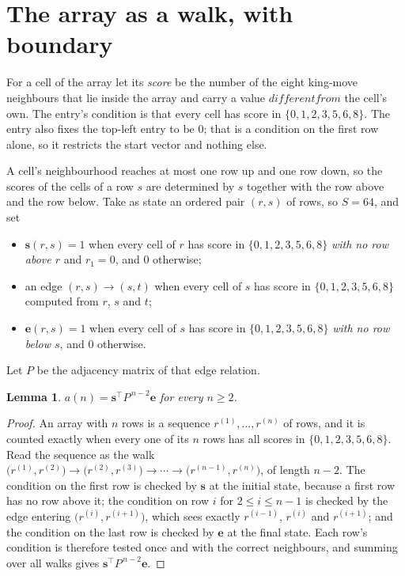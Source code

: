\documentclass[11pt,a4paper]{article}
\theoremstyle{plain}
\newtheorem{lemma}[theorem]{Lemma}
\theoremstyle{definition}
\begin{document}
\section{The array as a walk, with boundary}

For a cell of the array let its \emph{score} be the number of the eight king-move neighbours that lie inside
the array and carry a value $different from$ the cell's own. The entry's condition is that every cell
has score in $\{0,1,2,3,5,6,8\}$. The entry also fixes the top-left entry to be $0$; that is a condition on the first row alone, so it restricts the start vector and nothing else.

A cell's neighbourhood reaches at most one row up and one row down, so the scores of the
cells of a row $s$ are determined by $s$ together with the row above and the row below.
Take as state an ordered pair $(r,s)$ of rows, so $S=64$, and set
\begin{itemize}
\item $\mathbf{s}(r,s)=1$ when every cell of $r$ has score in $\{0,1,2,3,5,6,8\}$ \emph{with no row
above $r$} and $r_1=0$, and $0$ otherwise;
\item an edge $(r,s)\to(s,t)$ when every cell of $s$ has score in $\{0,1,2,3,5,6,8\}$ computed from
$r$, $s$ and $t$;
\item $\mathbf{e}(r,s)=1$ when every cell of $s$ has score in $\{0,1,2,3,5,6,8\}$ \emph{with no row
below $s$}, and $0$ otherwise.
\end{itemize}
Let $P$ be the adjacency matrix of that edge relation.

\begin{lemma}\label{lem:walk}
$a(n)=\mathbf{s}^{\!\top}P^{\,n-2}\mathbf{e}$ for every $n\ge2$.
\end{lemma}

\begin{proof}
An array with $n$ rows is a sequence $r^{(1)},\dots,r^{(n)}$ of rows, and it is counted
exactly when every one of its $n$ rows has all scores in $\{0,1,2,3,5,6,8\}$. Read the sequence as the
walk $\bigl(r^{(1)},r^{(2)}\bigr)\to\bigl(r^{(2)},r^{(3)}\bigr)\to\cdots\to
\bigl(r^{(n-1)},r^{(n)}\bigr)$, of length $n-2$. The condition on the first row is
checked by $\mathbf{s}$ at the initial state, because a first row has no row above it; the
condition on row $i$ for $2\le i\le n-1$ is checked by the edge entering
$\bigl(r^{(i)},r^{(i+1)}\bigr)$, which sees exactly $r^{(i-1)}$, $r^{(i)}$ and
$r^{(i+1)}$; and the condition on the last row is checked by $\mathbf{e}$ at the final
state. Each row's condition is therefore tested once and with the correct neighbours, and
summing over all walks gives $\mathbf{s}^{\!\top}P^{\,n-2}\mathbf{e}$.
\end{proof}
\end{document}
